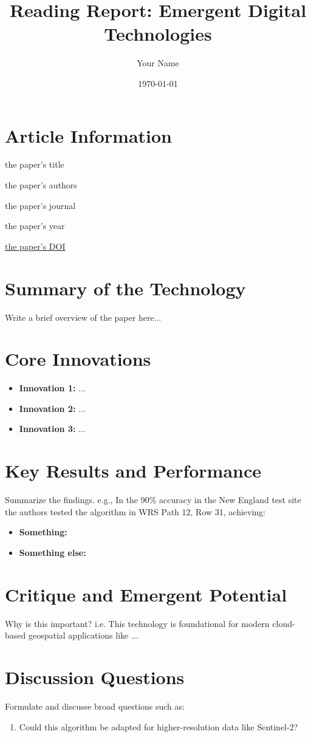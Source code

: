\documentclass[12pt]{article}
\title{Reading Report: Emergent Digital Technologies}
\author{Your Name}
\date{\today}
\begin{document}
	\maketitle

	\section{Article Information}
	\begin{description}[style=multiline, leftmargin=3cm, font=\bfseries]
		\item[Title:] the paper's title
		\item[Authors:] the paper's authors
		\item[Journal:] the paper's journal
		\item[Year:] the paper's year
		\item[DOI:] \href{https://doi.org/}{the paper's DOI}
	\end{description}

	\section{Summary of the Technology}
		Write a brief overview of the paper here...

	\section{Core Innovations}
		\begin{itemize}
			\item \textbf{Innovation 1:} ...
			\item \textbf{Innovation 2:} ...
			\item \textbf{Innovation 3:} ...
		\end{itemize}

	\section{Key Results and Performance}
		Summarize the findings.  e.g., In the 90\% accuracy in the New England test site the authors tested the algorithm in WRS Path 12, Row 31, achieving:

		\begin{itemize}
			\item \textbf{Something:}
			\item \textbf{Something else:}
		\end{itemize}

	\section{Critique and Emergent Potential}
		Why is this important?  i.e. This technology is foundational for modern cloud-based geospatial applications like ...

	\section{Discussion Questions}
		Formulate and discusse broad questions such as:
		\begin{enumerate}
			\item Could this algorithm be adapted for higher-resolution data like Sentinel-2?
		\end{enumerate}
\end{document}
